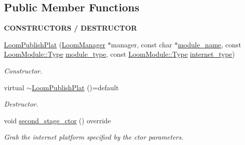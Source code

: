 \subsection*{Public Member Functions}
\begin{Indent}{\bf C\+O\+N\+S\+T\+R\+U\+C\+T\+O\+RS / D\+E\+S\+T\+R\+U\+C\+T\+OR}\par
\begin{DoxyCompactItemize}
\item 
\hyperlink{class_loom_publish_plat_a59b0b76a0a0507c211284f341c0c5b34}{Loom\+Publish\+Plat} (\hyperlink{class_loom_manager}{Loom\+Manager} $\ast$manager, const char $\ast$\hyperlink{class_loom_module_adf6e68ad7e9fa2acfca7a8a280680764}{module\+\_\+name}, const \hyperlink{class_loom_module_aee91d0a75140d51ee428fc2d4417d865}{Loom\+Module\+::\+Type} \hyperlink{class_loom_module_a152d394f37236a2b159dae19da67eeb0}{module\+\_\+type}, const \hyperlink{class_loom_module_aee91d0a75140d51ee428fc2d4417d865}{Loom\+Module\+::\+Type} \hyperlink{class_loom_publish_plat_aab697868e61843787893f5509d22b9ed}{internet\+\_\+type})
\begin{DoxyCompactList}\small\item\em Constructor. \end{DoxyCompactList}\item 
virtual \hyperlink{class_loom_publish_plat_a68870cd02f9de172d4bcf448060ef1ec}{$\sim$\+Loom\+Publish\+Plat} ()=default
\begin{DoxyCompactList}\small\item\em Destructor. \end{DoxyCompactList}\item 
void \hyperlink{class_loom_publish_plat_a9be9c86b766a6308fb2851875b50ba56}{second\+\_\+stage\+\_\+ctor} () override
\begin{DoxyCompactList}\small\item\em Grab the internet platform specified by the ctor parameters. \end{DoxyCompactList}\end{DoxyCompactItemize}
\end{Indent}
